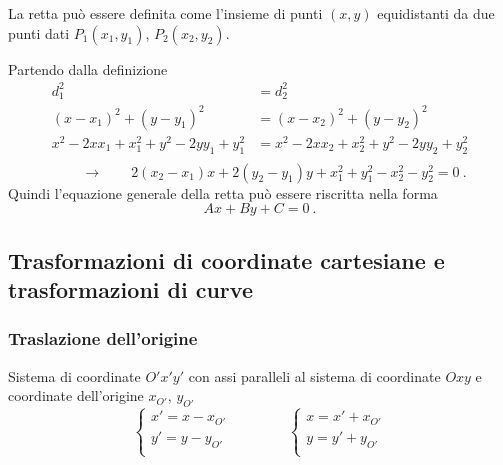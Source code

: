 \begin{definition}[Retta]
    La retta può essere definita come l'insieme di punti $(x,y)$ equidistanti da due punti dati $P_1(x_1,y_1)$, $P_2(x_2,y_2)$.
\end{definition}
Partendo dalla definizione
\begin{equation}
\begin{aligned}
    d_1^2 & = d_2^2 \\
    (x - x_1)^2 + (y-y_1)^2 & = (x - x_2)^2 + (y-y_2)^2 \\
    x^2 - 2 x x_1 + x_1^2 + y^2 - 2 y y_1 + y_1^2 & = x^2 - 2 x x_2 + x_2^2 + y^2 - 2 y y_2 + y_2^2 \\
\end{aligned}
\end{equation}
\begin{equation}
  \qquad \rightarrow \qquad 2(x_2 - x_1) x + 2(y_2 - y_1) y + x_1^2 + y_1^2 - x_2^2 - y_2^2 = 0 \ .
\end{equation}
Quindi l'equazione generale della retta può essere riscritta nella forma
\begin{equation}
    A x + B y + C = 0 \ .
\end{equation}

\subsection{Trasformazioni di coordinate cartesiane e trasformazioni di curve}
\subsubsection{Traslazione dell'origine}
Sistema di coordinate $O'x'y'$ con assi paralleli al sistema di coordinate $Oxy$ e coordinate dell'origine $x_{O'}$, $y_{O'}$
\begin{equation}
    \begin{cases}
        x' = x - x_{O'} \\
        y' = y - y_{O'} \\
    \end{cases}
    \qquad \qquad
    \begin{cases}
        x  = x'+ x_{O'} \\
        y  = y'+ y_{O'} \\
    \end{cases}
\end{equation}
